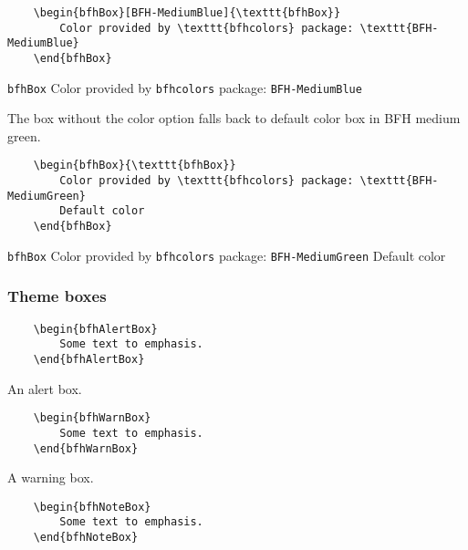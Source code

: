 \documentclass[
]{bfhpub}				%
\begin{document}
\begin{verbatim}
	\begin{bfhBox}[BFH-MediumBlue]{\texttt{bfhBox}}
		Color provided by \texttt{bfhcolors} package: \texttt{BFH-MediumBlue}
	\end{bfhBox}
\end{verbatim}


\begin{bfhBox}{\texttt{bfhBox}}
	Color provided by \texttt{bfhcolors} package: \texttt{BFH-MediumBlue}
\end{bfhBox}

The box without the color option falls back to default color box in BFH medium green.

\begin{verbatim}
	\begin{bfhBox}{\texttt{bfhBox}}
		Color provided by \texttt{bfhcolors} package: \texttt{BFH-MediumGreen}
		Default color
	\end{bfhBox}
\end{verbatim}

\begin{bfhBox}{\texttt{bfhBox}}
	Color provided by \texttt{bfhcolors} package: \texttt{BFH-MediumGreen}
	Default color
\end{bfhBox}


\subsubsection{Theme boxes}

\begin{verbatim}
	\begin{bfhAlertBox}
		Some text to emphasis.
	\end{bfhAlertBox}
\end{verbatim}

\begin{bfhAlertBox}
	An alert box.
\end{bfhAlertBox}

\begin{verbatim}
	\begin{bfhWarnBox}
		Some text to emphasis.
	\end{bfhWarnBox}
\end{verbatim}

\begin{bfhWarnBox}
	A warning box.
\end{bfhWarnBox}

\begin{verbatim}
	\begin{bfhNoteBox}
		Some text to emphasis.
	\end{bfhNoteBox}
\end{verbatim}
\end{document}
